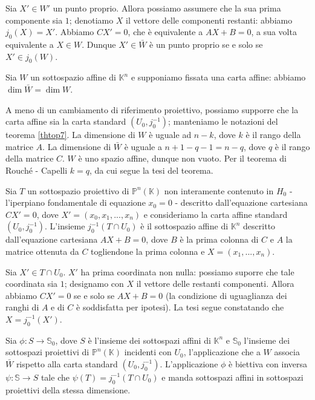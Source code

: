 	\par Sia $X' \in W'$ un punto proprio. Allora possiamo assumere che la sua prima componente sia $1$; denotiamo $X$ il vettore delle componenti restanti: abbiamo $j_0(X) = X'$. Abbiamo $CX' = 0$, che \`e equivalente a $AX + B = 0$, a sua volta equivalente a $X \in W$. Dunque $X' \in \bar{W}$ \`e un punto proprio se e solo se $X' \in j_0(W)$. \EndProof
\begin{Corollary}\label{cortop2}
	Sia $W$ un sottospazio affine di $\mathbb{K}^n$ e supponiamo fissata una carta affine: abbiamo $\dim \bar{W} = \dim W$.
\end{Corollary}
\Proof A meno di un cambiamento di riferimento proiettivo, possiamo supporre che la carta affine sia la carta standard $(U_0, j_0^{-1})$; manteniamo le notazioni del teorema \ref{thtop7}. La dimensione di $W$ \`e uguale ad $n - k$, dove $k$ \`e il rango della matrice $A$. La dimensione di $\bar{W}$ \`e uguale a $n + 1 - q - 1 = n - q$, dove $q$ \`e il rango della matrice $C$. $W$ \`e uno spazio affine, dunque non vuoto. Per il teorema di Rouch\'e - Capelli $k = q$, da cui segue la tesi del teorema. \EndProof
\begin{Theorem}\label{thtop8}
	Sia $T$ un sottospazio proiettivo di $\mathbb{P}^n(\mathbb{K})$ non interamente contenuto in $H_0$ - l'iperpiano fondamentale di equazione $x_0 = 0$ - descritto dall'equazione cartesiana $CX' = 0$, dove $X' = (x_0, x_1, ..., x_n)$ e consideriamo la carta affine standard $(U_0, j_0^{-1})$. L'insieme $j_0^{-1}(T \cap U_0)$ \`e il sottospazio affine di $\mathbb{K}^n$ descritto dall'equazione cartesiana $AX + B = 0$, dove $B$ \`e la prima colonna di $C$ e $A$ la matrice ottenuta da $C$ togliendone la prima colonna e $X = (x_1, ..., x_n)$.
\end{Theorem}
\Proof Sia $X' \in T \cap U_0$. $X'$ ha prima coordinata non nulla: possiamo suporre che tale coordinata sia $1$; designamo con $X$ il vettore delle restanti componenti. Allora abbiamo $CX' = 0$ se e solo se $AX + B = 0$ (la condizione di uguaglianza dei ranghi di $A$ e di $C$ \`e soddisfatta per ipotesi). La tesi segue constatando che $X = j_0^{-1}(X')$. \EndProof
\begin{Theorem}\label{thtop9}
	Sia $\phi: S \rightarrow \mathbb{S}_0$, dove $S$ \`e l'insieme dei sottospazi affini di $\mathbb{K}^n$ e $\mathbb{S}_0$ l'insieme dei sottospazi proiettivi di $\mathbb{P}^n(\mathbb{K})$ incidenti con $U_0$, l'applicazione che a $W$ associa $\bar{W}$ rispetto alla carta standard $(U_0, j_0^{-1})$. L'applicazione $\phi$ \`e biettiva con inversa $\psi: \mathbb{S} \rightarrow S$ tale che $\psi(T) = j_0^{-1}(T \cap U_0)$ e manda sottospazi affini in sottospazi proiettivi della stessa dimensione.
\end{Theorem}
